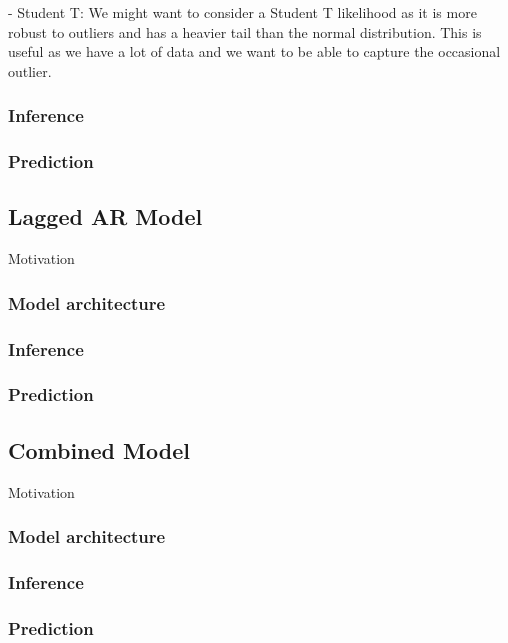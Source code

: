   - Student T:
  We might want to consider a Student T likelihood as it is more robust to outliers
  and has a heavier tail than the normal distribution. This is useful as we have
  a lot of data and we want to be able to capture the occasional outlier.


\subsubsection{Inference}

\subsubsection{Prediction}

\subsection{Lagged AR Model}

Motivation

\subsubsection{Model architecture}



\subsubsection{Inference}

\subsubsection{Prediction}

\subsection{Combined Model}

Motivation

\subsubsection{Model architecture}



\subsubsection{Inference}

\subsubsection{Prediction}

